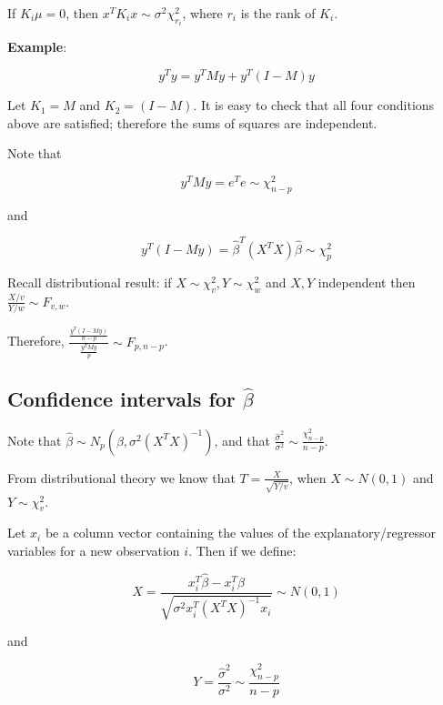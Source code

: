 If $K_i \mu = 0$, then $ x^T K_i x\sim \sigma^2 \chi_{r_i}^2$, where $r_i$ is the rank of $K_i$.

\textbf{Example}:

\begin{equation}
y^T y  = y^T M y + y^T (I-M) y 
\end{equation}

Let $K_1 = M$ and $K_2 = (I-M)$. It is easy to check that all four conditions above are satisfied; therefore the sums of squares are independent.

Note that 

\begin{equation}
 y^T M y  = e^T e \sim \chi^2_{n-p}
\end{equation}

and

\begin{equation}
 y^T (I-M y)  = \hat{\beta}^T (X^T X) \hat{\beta} \sim \chi^2_{p}
\end{equation}

Recall distributional result: if $X\sim \chi_v^2, Y\sim \chi_w^2$ and $X,Y$ independent then $\frac{X/v}{Y/w}\sim F_{v,w}$.  

Therefore, $ \frac{\frac{y^T (I-M y)}{n-p}}{\frac{y^T M y}{p}}\sim F_{p,n-p}$.

\subsection{Confidence intervals for $\hat{\beta}$}

Note that $\hat{\beta} \sim N_p (\beta,\sigma^2 (X^T X)^{-1})$, and that 
$\frac{\hat{\sigma}^2}{\sigma^2} \sim  \frac{\chi^2_{n-p}}{n-p}$.

From distributional theory we know that $T=\frac{X}{\sqrt{Y/v}}$, when $X\sim N(0,1)$ and $Y\sim \chi^2_{v}$. 

Let 
 $x_i$ be a column vector containing the values of the explanatory/regressor variables for a new observation $i$. Then if we define:

\begin{equation}
X=\frac{x_i^T \hat{\beta} - x_i^T \beta}{\sqrt{\sigma^2 x_i^T (X^T X)^{-1}x_i}} \sim N(0,1)
\end{equation}

\noindent
and 

\begin{equation}
Y=\frac{\hat{\sigma}^2}{\sigma^2} \sim  \frac{\chi^2_{n-p}}{n-p}
\end{equation}


